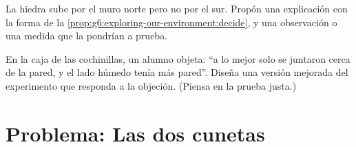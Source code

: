 \begin{exercise}[$\star\star$]\label{exo:g6:exploring-our-environment:11}
La hiedra sube por el muro norte pero no por el sur. Propón una
explicación con la forma de la
\cref{prop:g6:exploring-our-environment:decide}, y una observación o
una medida que la pondrían a prueba.
\end{exercise}

\begin{exercise}[$\star\star\star$]\label{exo:g6:exploring-our-environment:12}
En la caja de las cochinillas, un alumno objeta: ``a lo mejor solo se
juntaron cerca de la pared, y el lado húmedo tenía más pared''. Diseña
una versión mejorada del experimento que responda a la objeción.
(Piensa en la prueba justa.)
\end{exercise}

\section{Problema: Las dos cunetas}


